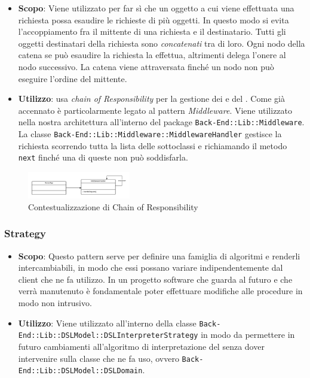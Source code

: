 \begin{itemize}

	\item \textbf{Scopo}: Viene utilizzato per far sì che un oggetto a cui viene effettuata una richiesta possa esaudire le richieste di più oggetti. In questo modo si evita l'accoppiamento fra il mittente di una richiesta e il destinatario. Tutti gli oggetti destinatari della richiesta sono \textit{concatenati} tra di loro. Ogni nodo della catena se può esaudire la richiesta la effettua, altrimenti delega l'onere al nodo successivo. La catena viene attraversata finché un nodo non può eseguire l'ordine del mittente. 
	\item \textbf{Utilizzo}:  usa \textit{chain of Responsibility} per la gestione dei  e del . Come già accennato è particolarmente legato al pattern \textit{Middleware}. Viene utilizzato nella nostra architettura all'interno del package \texttt{Back-End::Lib::Middleware}. La classe \texttt{Back-End::Lib::Middleware::MiddlewareHandler} gestisce la richiesta scorrendo tutta la lista delle sottoclassi e richiamando il metodo \texttt{next} finché una di queste non può soddisfarla.

\end{itemize}

\begin{figure}[H]
\centering \includegraphics[width=0.4\textwidth]{patterns/contestualizzazione/chain-of-responsability.png}
\caption{Contestualizzazione di Chain of Responsibility}
\label{fig:mvc}
\end{figure}

\subsubsection{Strategy}

\begin{itemize}

	\item \textbf{Scopo}: Questo pattern serve per definire una famiglia di algoritmi e renderli intercambiabili, in modo che essi possano variare indipendentemente dal client che ne fa utilizzo. In un progetto software che guarda al futuro e che verrà manutenuto è fondamentale poter effettuare modifiche alle procedure in modo non intrusivo.
	\item \textbf{Utilizzo}: Viene utilizzato all'interno della classe \texttt{Back-End::Lib::DSLModel::DSLInterpreterStrategy} in modo da permettere in futuro cambiamenti all'algoritmo di interpretazione del  senza dover intervenire sulla classe che ne fa uso, ovvero \texttt{Back-End::Lib::DSLModel::DSLDomain}.

\end{itemize}

